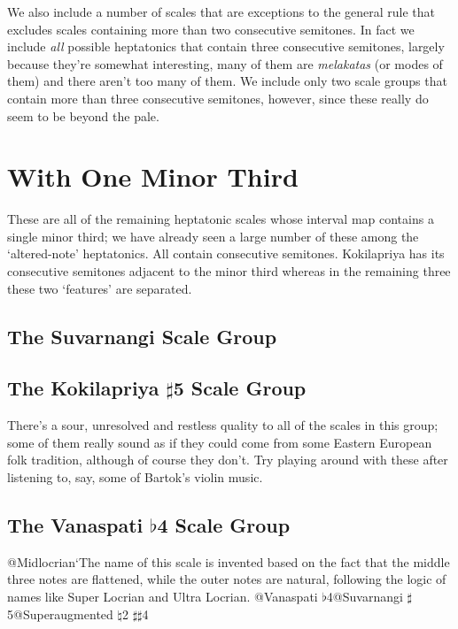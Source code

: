 \documentclass[english]{./gbook}
\begin{document}
\begin{large}
We also include a number of scales that are exceptions to the general rule that excludes scales containing more than two consecutive semitones. In fact we include \emph{all} possible heptatonics that contain three consecutive semitones, largely because they're somewhat interesting, many of them are \emph{melakatas} (or modes of them) and there aren't too many of them. We include only two scale groups that contain more than three consecutive semitones, however, since these really do seem to be beyond the pale.


\section{With One Minor Third}

These are all of the remaining heptatonic scales whose interval map contains a single minor third; we have already seen a large number of these among the `altered-note' heptatonics. All contain consecutive semitones. Kokilapriya has its consecutive semitones adjacent to the minor third whereas in the remaining three these two `features' are separated.

\subsection{The Suvarnangi Scale Group}

\subsection{The Kokilapriya $\sharp$5 Scale Group}

There's a sour, unresolved and restless quality to all of the scales in this group; some of them really sound as if they could come from some Eastern European folk tradition, although of course they don't. Try playing around with these after listening to, say, some of Bartok's violin music.


\subsection{The Vanaspati $\flat$4 Scale Group}
@Midlocrian`The name of this scale is invented based on the fact that the middle three notes are flattened, while the outer notes are natural, following the logic of names like Super Locrian and Ultra Locrian.
@Vanaspati $\flat$4@Suvarnangi $\sharp$5@Superaugmented $\natural$2 $\sharp\sharp$4%


\end{large}
\end{document}
